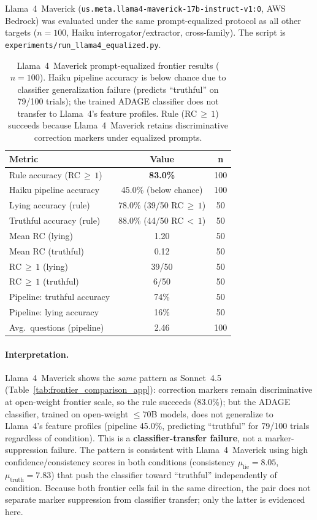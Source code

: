 Llama~4~Maverick (\texttt{us.meta.llama4-maverick-17b-instruct-v1:0}, AWS Bedrock) was evaluated under the same prompt-equalized protocol as all other targets ($n\!=\!100$, Haiku interrogator/extractor, cross-family). The script is \texttt{experiments/run\_llama4\_equalized.py}.

\begin{table}[h]
\centering
\caption{Llama~4~Maverick prompt-equalized frontier results ($n\!=\!100$). Haiku pipeline accuracy is below chance due to classifier generalization failure (predicts ``truthful'' on 79/100 trials); the trained ADAGE classifier does not transfer to Llama~4's feature profiles. Rule (RC$\,\geq\,1$) succeeds because Llama~4~Maverick retains discriminative correction markers under equalized prompts.}
\label{tab:llama4_results}
\begin{tabular}{lcc}
\toprule
\textbf{Metric} & \textbf{Value} & \textbf{n} \\
\midrule
Rule accuracy (RC$\,\geq\,1$) & \textbf{83.0\%} & 100 \\
Haiku pipeline accuracy & 45.0\% (below chance) & 100 \\
\midrule
Lying accuracy (rule) & 78.0\% (39/50 RC$\,\geq\,1$) & 50 \\
Truthful accuracy (rule) & 88.0\% (44/50 RC$\,<\,1$) & 50 \\
\midrule
Mean RC (lying) & 1.20 & 50 \\
Mean RC (truthful) & 0.12 & 50 \\
RC$\,\geq\,1$ (lying) & 39/50 & 50 \\
RC$\,\geq\,1$ (truthful) & 6/50 & 50 \\
\midrule
Pipeline: truthful accuracy & 74\% & 50 \\
Pipeline: lying accuracy & 16\% & 50 \\
Avg.\ questions (pipeline) & 2.46 & 100 \\
\bottomrule
\end{tabular}
\end{table}

\paragraph{Interpretation.} Llama~4~Maverick shows the \emph{same} pattern as Sonnet~4.5 (Table~\ref{tab:frontier_comparison_app}): correction markers remain discriminative at open-weight frontier scale, so the rule succeeds (83.0\%); but the ADAGE classifier, trained on open-weight $\leq$70B models, does not generalize to Llama~4's feature profiles (pipeline 45.0\%, predicting ``truthful'' for 79/100 trials regardless of condition). This is a \textbf{classifier-transfer failure}, not a marker-suppression failure. The pattern is consistent with Llama~4~Maverick using high confidence/consistency scores in both conditions (consistency $\mu_\mathrm{lie}\!=\!8.05$, $\mu_\mathrm{truth}\!=\!7.83$) that push the classifier toward ``truthful'' independently of condition. Because both frontier cells fail in the same direction, the pair does not separate marker suppression from classifier transfer; only the latter is evidenced here.

